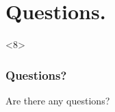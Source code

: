\documentclass{beamer}
\begin{document}
\section{Questions.}

\begin{frame}<8>
\frametitle{Questions?}

\begin{block}{}
Are there any questions?
\end{block}

\end{frame}
\end{document}
